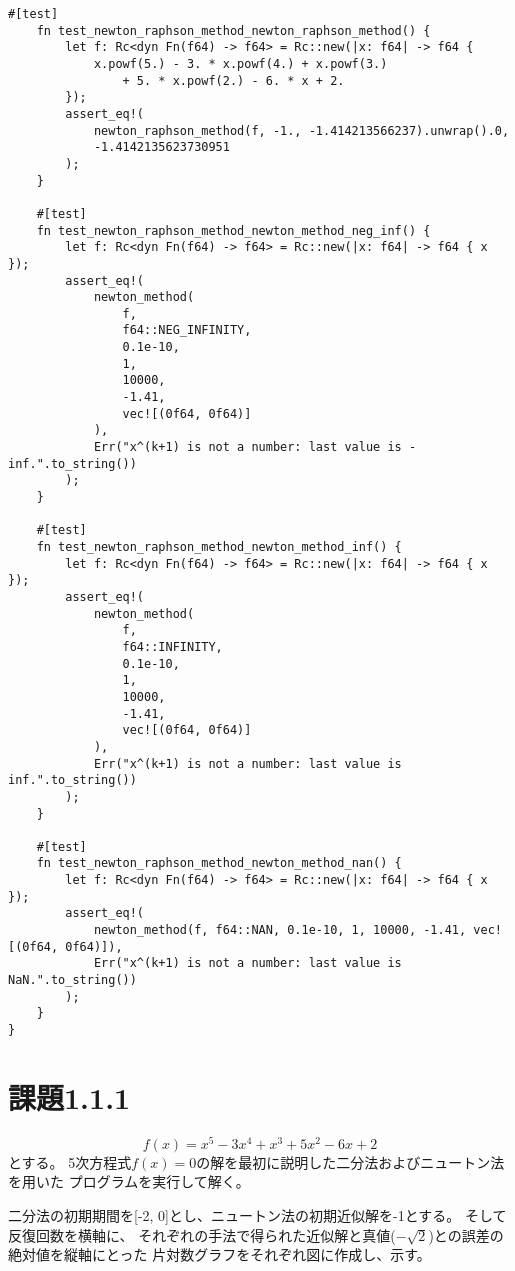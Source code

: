 \documentclass[uplatex, 11pt,a4j, titlepage]{jsarticle}
\begin{document}
\begin{lstlisting}[caption={newton\_raphson\_method.rs}]
    #[test]
    fn test_newton_raphson_method_newton_raphson_method() {
        let f: Rc<dyn Fn(f64) -> f64> = Rc::new(|x: f64| -> f64 {
            x.powf(5.) - 3. * x.powf(4.) + x.powf(3.) 
                + 5. * x.powf(2.) - 6. * x + 2.
        });
        assert_eq!(
            newton_raphson_method(f, -1., -1.414213566237).unwrap().0,
            -1.4142135623730951
        );
    }
    
    #[test]
    fn test_newton_raphson_method_newton_method_neg_inf() {
        let f: Rc<dyn Fn(f64) -> f64> = Rc::new(|x: f64| -> f64 { x });
        assert_eq!(
            newton_method(
                f,
                f64::NEG_INFINITY,
                0.1e-10,
                1,
                10000,
                -1.41,
                vec![(0f64, 0f64)]
            ),
            Err("x^(k+1) is not a number: last value is -inf.".to_string())
        );
    }
    
    #[test]
    fn test_newton_raphson_method_newton_method_inf() {
        let f: Rc<dyn Fn(f64) -> f64> = Rc::new(|x: f64| -> f64 { x });
        assert_eq!(
            newton_method(
                f,
                f64::INFINITY,
                0.1e-10,
                1,
                10000,
                -1.41,
                vec![(0f64, 0f64)]
            ),
            Err("x^(k+1) is not a number: last value is inf.".to_string())
        );
    }
    
    #[test]
    fn test_newton_raphson_method_newton_method_nan() {
        let f: Rc<dyn Fn(f64) -> f64> = Rc::new(|x: f64| -> f64 { x });
        assert_eq!(
            newton_method(f, f64::NAN, 0.1e-10, 1, 10000, -1.41, vec![(0f64, 0f64)]),
            Err("x^(k+1) is not a number: last value is NaN.".to_string())
        );
    }
} 
\end{lstlisting}


\section{課題1.1.1}
\begin{equation}
    f(x) = x^5 - 3 x^4 + x^3 + 5 x^2 - 6x + 2 
\end{equation}
とする。
5次方程式$f(x) = 0$の解を最初に説明した二分法およびニュートン法を用いた
プログラムを実行して解く。


二分法の初期期間を[-2, 0]とし、ニュートン法の初期近似解を-1とする。
そして反復回数を横軸に、
それぞれの手法で得られた近似解と真値($-\sqrt{2}$)との誤差の絶対値を縦軸にとった
片対数グラフをそれぞれ図\label{bis_new}に作成し、示す。
\end{document}
